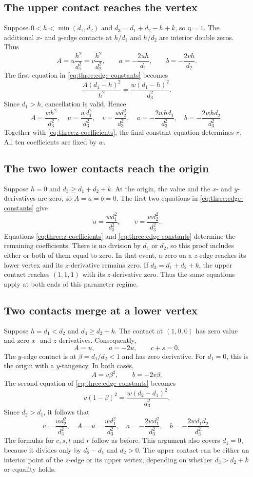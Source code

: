 \subsection{The upper contact reaches the vertex}

Suppose $0<h<\min(d_1,d_2)$ and
$d_3=d_1+d_2-h+k$, so $\eta=1$. The additional $x$- and $y$-edge
contacts at $h/d_1$ and $h/d_2$ are interior double zeros. Thus
\[
 A=u\frac{h^2}{d_1^2}=v\frac{h^2}{d_2^2},\qquad
 a=-\frac{2uh}{d_1},\qquad b=-\frac{2vh}{d_2}.
\]
The first equation in \eqref{eq:three:edge-constants} becomes
\[
 \frac{A(d_1-h)^2}{h^2}
       =\frac{w(d_1-h)^2}{d_3^2}.
\]
Since $d_1>h$, cancellation is valid. Hence
\[
 A=\frac{wh^2}{d_3^2},\quad
 u=\frac{wd_1^2}{d_3^2},\quad
 v=\frac{wd_2^2}{d_3^2},\quad
 a=-\frac{2whd_1}{d_3^2},\quad
 b=-\frac{2whd_2}{d_3^2}.
\]
Together with \eqref{eq:three:z-coefficients}, the final constant equation
determines $r$. All ten coefficients are fixed by $w$.

\subsection{The two lower contacts reach the origin}

Suppose $h=0$ and $d_3\ge d_1+d_2+k$. At the origin, the value and
the $x$- and $y$-derivatives are zero, so $A=a=b=0$.
The first two equations in \eqref{eq:three:edge-constants} give
\[
 u=\frac{wd_1^2}{d_3^2},\qquad
 v=\frac{wd_2^2}{d_3^2}.
\]
Equations \eqref{eq:three:z-coefficients} and
\eqref{eq:three:edge-constants} determine the remaining coefficients.
There is no division by $d_1$ or $d_2$, so this proof includes either or
both of them equal to zero. In that event, a zero on a $z$-edge reaches
its lower vertex and its $z$-derivative remains zero. If
$d_3=d_1+d_2+k$, the upper contact reaches $(1,1,1)$ with its
$z$-derivative zero. Thus the same equations apply at both ends of this
parameter regime.

\subsection{Two contacts merge at a lower vertex}

Suppose $h=d_1<d_2$ and $d_3\ge d_2+k$. The contact at $(1,0,0)$
has zero value and zero $x$- and $z$-derivatives. Consequently,
\[
 A=u,\qquad a=-2u,\qquad c+s=0.
\]
The $y$-edge contact is at $\beta=d_1/d_2<1$ and has zero derivative.
For $d_1=0$, this is the origin with a $y$-tangency. In both cases,
\[
 A=v\beta^2,\qquad b=-2v\beta.
\]
The second equation of \eqref{eq:three:edge-constants} becomes
\[
 v(1-\beta)^2=\frac{w(d_2-d_1)^2}{d_3^2}.
\]
Since $d_2>d_1$, it follows that
\[
 v=\frac{wd_2^2}{d_3^2},\quad
 A=u=\frac{wd_1^2}{d_3^2},\quad
 a=-\frac{2wd_1^2}{d_3^2},\quad
 b=-\frac{2wd_1d_2}{d_3^2}.
\]
The formulas for $c,s,t$ and $r$ follow as before. This argument also
covers $d_1=0$, because it divides only by $d_2-d_1$ and $d_2>0$.
The upper contact can be either an interior point of the $z$-edge or its
upper vertex, depending on whether $d_3>d_2+k$ or equality holds.


